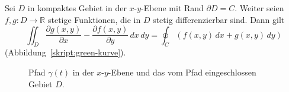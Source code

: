 \begin{satz}[Green]
\label{skript:2dim green}
Sei $D$ in kompaktes Gebiet in der $x$-$y$-Ebene mit Rand $\partial D=C$.
Weiter seien $f,g\colon D\to\mathbb R$ stetige Funktionen, die in $D$ 
stetig differenzierbar sind.
Dann gilt
\begin{equation}
\iint_{D}
\frac{\partial g(x,y)}{\partial x}
-
\frac{\partial f(x,y)}{\partial y}\,dx\,dy
=
\oint_C (f(x,y)\,dx + g(x,y)\,dy)
\label{skript:green formel}
\end{equation}
(Abbildung~\ref{skript:green-kurve}).
\end{satz}

\begin{figure}
\centering
{}
\caption{Pfad $\gamma(t)$ in der $x$-$y$-Ebene und das vom Pfad eingeschlossen
Gebiet $D$.
\label{green:beweis}}
\end{figure}

